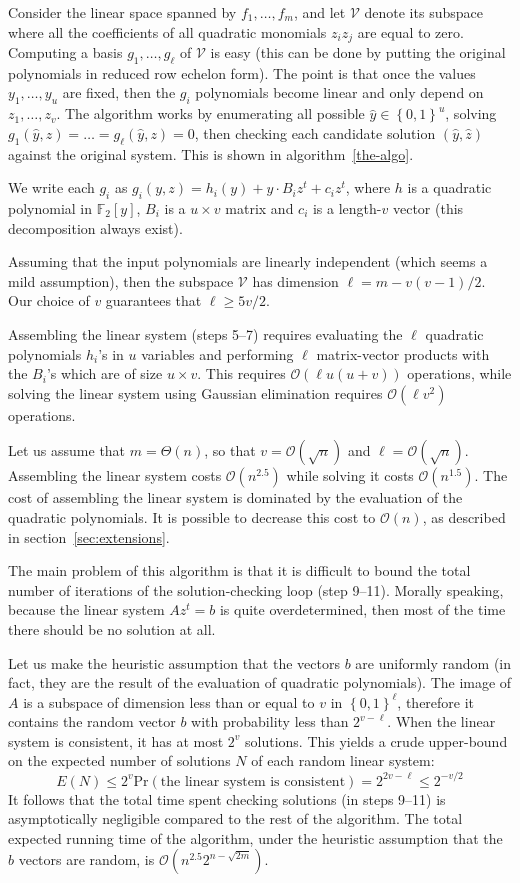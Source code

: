 \documentclass[a4paper,UKenglish,cleveref, autoref]{lipics-v2019}
\newcommand{\bits}{\left\{0, 1\right\}}
\newcommand{\bigO}[1]{\ensuremath{\mathcal{O}\left( #1 \right)} }
\newcommand{\bigTheta}[1]{\ensuremath{\Theta\left( #1 \right)} }
\begin{document}
Consider the linear space spanned by $f_1, \dots, f_m$, and let $\mathcal{V}$
denote its subspace where all the coefficients of all quadratic monomials
$z_i z_j$ are equal to zero. Computing a basis $g_1, \dots, g_\ell$ of
$\mathcal{V}$ is easy (this can be done by putting the original polynomials in
reduced row echelon form). The point is that once the values $y_1, \dots, y_u$
are fixed, then the $g_i$ polynomials become linear and only depend on
$z_1, \dots, z_v$. The algorithm works by enumerating all possible $\hat y \in \bits^u$, solving
$g_1(\hat y, z) = \dots = g_\ell(\hat y, z) = 0$, then checking each candidate
solution $(\hat y, \hat z)$ against the original system. This is shown in algorithm~\ref{the-algo}.

We write each $g_i$ as $g_i(y, z) = h_i(y) + y \cdot B_i z^t + c_i z^t$, where
$h$ is a quadratic polynomial in $\mathbb{F}_2[y]$, $B_i$ is a $u \times v$
matrix and $c_i$ is a length-$v$ vector (this decomposition always exist).

Assuming that the input polynomials are linearly independent (which seems a mild
assumption), then the subspace $\mathcal{V}$ has dimension
$\ell = m - v(v-1)/2$. Our choice of $v$ guarantees that $\ell \geq 5v/2$.

Assembling the linear system (steps 5--7) requires evaluating the $\ell$
quadratic polynomials $h_i$'s in $u$ variables and performing $\ell$
matrix-vector products with the $B_i$'s which are of size $u \times v$.  This
requires $\bigO{\ell u(u+v)}$ operations, while solving the linear system using
Gaussian elimination requires $\bigO{\ell v^2}$ operations.

Let us assume that $m = \bigTheta{n}$, so that $v = \bigO{\sqrt{n}}$ and
$\ell = \bigO{\sqrt{n}}$. Assembling the linear system costs $\bigO{n^{2.5}}$
while solving it costs $\bigO{n^{1.5}}$. The cost of assembling the linear
system is dominated by the evaluation of the quadratic polynomials. It is
possible to decrease this cost to $\bigO{n}$, as described in
section~\ref{sec:extensions}.

The main problem of this algorithm is that it is difficult to bound the total
number of iterations of the solution-checking loop (step 9--11). Morally
speaking, because the linear system $A z^t = b$ is quite overdetermined, then most
of the time there should be no solution at all.

Let us make the heuristic assumption that the vectors $b$ are uniformly random
(in fact, they are the result of the evaluation of quadratic polynomials). The
image of $A$ is a subspace of dimension less than or equal to $v$ in
$\bits^\ell$, therefore it contains the random vector $b$ with probability less
than $2^{v-\ell}$. When the linear system is consistent, it has at most $2^v$
solutions. This yields a crude upper-bound on the expected number of solutions
$N$ of each random linear system:
\[
  E(N) \leq 2^v \mathrm{Pr}(\text{the linear system is consistent}) = 2^{2v - \ell} \leq 2^{-v/2}
\]
It follows that the total time spent checking solutions (in steps 9--11) is
asymptotically negligible compared to the rest of the algorithm.  The total
expected running time of the algorithm, under the heuristic assumption that the
$b$ vectors are random, is $\bigO{n^{2.5} 2^{n - \sqrt{2m}}}$.
\end{document}
